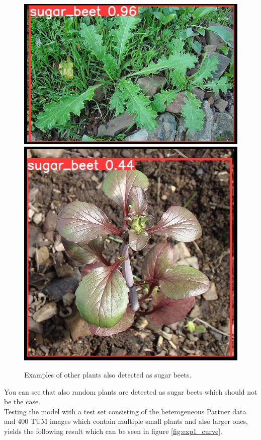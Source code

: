 \begin{figure}[htb!]
	\centering
	\includegraphics[scale=0.458]{figures/false_positive_1.png}
	\includegraphics[scale=0.3]{figures/false_positive_2.png}
	\caption{Examples of other plants also detected as sugar beets.}
	\label{fig:false_positives}
\end{figure}

You can see that also random plants are detected as sugar beets which should not be the case.\\

Testing the model with a test set consisting of the heterogeneous Partner data and 400 TUM images which contain multiple small plants and also larger ones, yields the following result which can be seen in figure \ref{fig:exp1_curve}.

